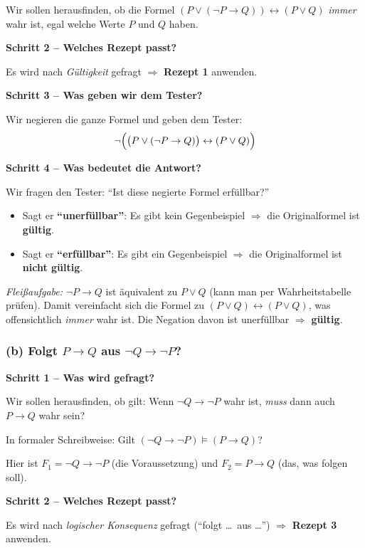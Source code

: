 \documentclass[a4paper,12pt]{article}
\begin{document}
Wir sollen herausfinden, ob die Formel
$(P \vee (\neg P \to Q)) \leftrightarrow (P \vee Q)$
\emph{immer} wahr ist, egal welche Werte $P$ und $Q$ haben.

\medskip
\textbf{Schritt 2 -- Welches Rezept passt?}

Es wird nach \emph{G\"ultigkeit} gefragt $\Rightarrow$ \textbf{Rezept 1} anwenden.

\medskip
\textbf{Schritt 3 -- Was geben wir dem Tester?}

Wir negieren die ganze Formel und geben dem Tester:
\[
  \neg\Bigl(\bigl(P \vee (\neg P \to Q)\bigr) \leftrightarrow (P \vee Q)\Bigr)
\]

\textbf{Schritt 4 -- Was bedeutet die Antwort?}

Wir fragen den Tester: "`Ist diese negierte Formel erf\"ullbar?"'
\begin{itemize}
\item Sagt er \textbf{"`unerf\"ullbar"'}: Es gibt kein Gegenbeispiel
      $\Rightarrow$ die Originalformel ist \textbf{g\"ultig}.
\item Sagt er \textbf{"`erf\"ullbar"'}: Es gibt ein Gegenbeispiel
      $\Rightarrow$ die Originalformel ist \textbf{nicht g\"ultig}.
\end{itemize}

\medskip
\textit{Flei\ss aufgabe:} $\neg P \to Q$ ist \"aquivalent zu $P \vee Q$
(kann man per Wahrheitstabelle pr\"ufen). Damit vereinfacht sich die
Formel zu $(P \vee Q) \leftrightarrow (P \vee Q)$, was offensichtlich
\emph{immer} wahr ist. Die Negation davon ist unerf\"ullbar
$\Rightarrow$ \textbf{g\"ultig}.

\subsubsection*{(b) Folgt $P \to Q$ aus $\neg Q \to \neg P$?}

\textbf{Schritt 1 -- Was wird gefragt?}

Wir sollen herausfinden, ob gilt: Wenn $\neg Q \to \neg P$ wahr ist,
\emph{muss} dann auch $P \to Q$ wahr sein?

In formaler Schreibweise: Gilt $(\neg Q \to \neg P) \models (P \to Q)$?

Hier ist $F_1 = \neg Q \to \neg P$ (die Voraussetzung) und
$F_2 = P \to Q$ (das, was folgen soll).

\medskip
\textbf{Schritt 2 -- Welches Rezept passt?}

Es wird nach \emph{logischer Konsequenz} gefragt ("`folgt \ldots\ aus \ldots"')
$\Rightarrow$ \textbf{Rezept 3} anwenden.
\end{document}
